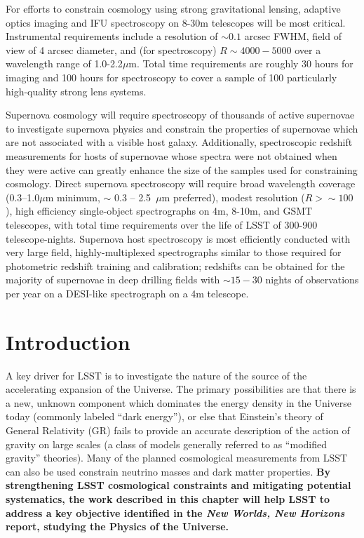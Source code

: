 \documentclass[12pt]{report}
\begin{document}
For efforts to constrain cosmology using strong gravitational lensing, adaptive optics imaging and IFU spectroscopy on 8-30m telescopes will be most critical.  Instrumental requirements include a resolution of $\sim 0.1$ arcsec FWHM, field of view of 4 arcsec diameter, and (for spectroscopy) $R \sim 4000 - 5000$ over a wavelength range of 1.0-2.2$\mu$m.   Total time requirements are roughly 30 hours for imaging and 100 hours for spectroscopy to cover a sample of 100 particularly high-quality strong lens systems.  

Supernova cosmology will require spectroscopy of thousands of active supernovae to investigate supernova physics and constrain the properties of supernovae which are not associated with a visible host galaxy.  Additionally, spectroscopic redshift measurements for hosts of supernovae whose spectra were not obtained when they were active can greatly enhance the size of the samples used for constraining cosmology.  Direct supernova spectroscopy will require broad wavelength coverage (0.3--1.0$\mu$m minimum, $\sim$ 0.3 -- 2.5~$\mu$m preferred), modest resolution ($R>\sim 100$), high efficiency single-object spectrographs on 4m, 8-10m, and GSMT telescopes, with total time requirements over the life of LSST of 300-900 telescope-nights.  Supernova host spectroscopy is most efficiently conducted with very large field, highly-multiplexed spectrographs similar to those required for photometric redshift training and calibration; redshifts can be obtained for the majority of supernovae in deep drilling fields with $\sim 15-30$ nights of observations per year on a DESI-like spectrograph on a 4m telescope.    

\section{Introduction}

A key driver for LSST is to investigate the nature of the source of the accelerating expansion of the Universe.  The primary possibilities are that there is a new, unknown component which dominates the energy density in the Universe today (commonly labeled ``dark energy''), or else that Einstein's theory of General Relativity (GR) fails to provide an accurate description of the action of gravity on large scales (a class of models generally referred to as ``modified gravity'' theories).  Many of the planned cosmological measurements from LSST can also be used constrain neutrino masses and dark matter properties.  {\bf By strengthening LSST cosmological constraints and mitigating potential systematics, the work described in this chapter will help LSST to address a key objective identified in the {\it New Worlds, New Horizons} report, studying the Physics of the Universe.}
\end{document}
